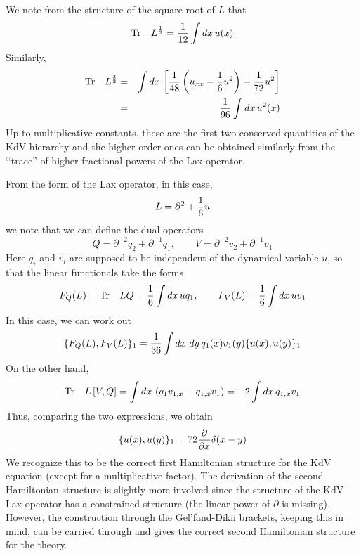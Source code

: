 \documentclass[a4paper,11pt]{article}
\begin{document}
We note from the structure of the square root of $L$ that
\begin{equation}
{\rm Tr}\quad L^{1\over 2} = {1\over 12} \int dx\, u(x)
\end{equation}
Similarly,
\begin{eqnarray}
{\rm Tr}\quad L^{3\over 2} & = & \int dx\,\left[{1\over
48}\left(u_{xx}-{1\over 6} u^{2}\right) + {1\over 72}
u^{2}\right]\nonumber\\
 & = & {1\over 96} \int dx\, u^{2}(x)
\end{eqnarray}
Up to multiplicative constants, these are the first two conserved
quantities of the KdV hierarchy and the higher order ones can be
obtained similarly from the \lq\lq trace'' of higher fractional powers
of the Lax operator.

From the form of the Lax operator, in this case,
$$
L = \partial^{2} + {1\over 6} u
$$
we note that we can define the dual operators
\begin{equation}
Q = \partial^{-2}q_{2} + \partial^{-1}q_{1},\qquad V =
\partial^{-2}v_{2} + \partial^{-1}v_{1}
\end{equation}
Here $q_{i}$ and $v_{i}$ are supposed to be independent of the
dynamical variable $u$, so that the linear functionals take the forms
\begin{equation}
F_{Q}(L) = {\rm Tr}\quad LQ = {1\over 6}\int dx\,uq_{1},\qquad
F_{V}(L) = {1\over 6} \int dx\,uv_{1}
\end{equation}
In this case, we can work out
\begin{equation}
\{F_{Q}(L) , F_{V}(L)\}_{1} = {1\over 36} \int dx\
dy\,q_{1}(x)v_{1}(y) \{u(x) , u(y)\}_{1}
\end{equation}
On the other hand,
\begin{equation}
{\rm Tr}\quad L \left[V , Q\right] = \int dx\, \left(q_{1}v_{1,x} -
q_{1,x}v_{1}\right) = - 2\int dx\, q_{1,x} v_{1}
\end{equation}
Thus, comparing the two expressions, we obtain
\begin{equation}
\{u(x) , u(y)\}_{1} = 72 {\partial\over \partial x}\delta (x-y)
\end{equation}
We recognize this to be the correct first Hamiltonian structure for
the KdV equation (except for a multiplicative factor). The derivation
of the  second Hamiltonian structure
is slightly more involved since the structure of the KdV Lax operator
has a constrained structure (the linear power of $\partial$ is
missing). However, the construction through the Gel'fand-Dikii
brackets, keeping this in mind, can be carried through and gives the
correct second Hamiltonian structure for the theory.  
\end{document}
